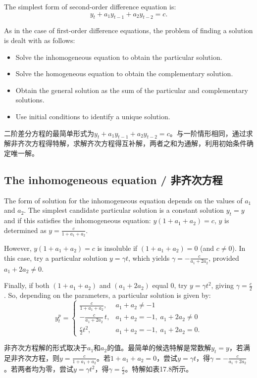 \begin{original}
The simplest form of second-order difference equation is:
\[
y_t + a_1 y_{t-1} + a_2 y_{t-2} = c.
\]

As in the case of first-order difference equations, the problem of finding a solution is dealt with as follows:
\begin{itemize}
\item Solve the inhomogeneous equation to obtain the particular solution.
\item Solve the homogeneous equation to obtain the complementary solution.
\item Obtain the general solution as the sum of the particular and complementary solutions.
\item Use initial conditions to identify a unique solution.
\end{itemize}
\end{original}
\begin{translation}
二阶差分方程的最简单形式为$y_t + a_1 y_{t-1} + a_2 y_{t-2} = c$。与一阶情形相同，通过求解非齐次方程得特解，求解齐次方程得互补解，两者之和为通解，利用初始条件确定唯一解。
\end{translation}

\subsection{The inhomogeneous equation / 非齐次方程}

\begin{original}
The form of solution for the inhomogeneous equation depends on the values of $a_1$ and $a_2$. The simplest candidate particular solution is a constant solution $y_t = y$ and if this satisfies the inhomogeneous equation: $y(1 + a_1 + a_2) = c$, $y$ is determined as $y = \frac{c}{1+a_1+a_2}$.

However, $y(1 + a_1 + a_2) = c$ is insoluble if $(1 + a_1 + a_2) = 0$ (and $c \neq 0$). In this case, try a particular solution $y = \gamma t$, which yields $\gamma = -\frac{c}{a_1+2a_2}$, provided $a_1 + 2a_2 \neq 0$.

Finally, if both $(1 + a_1 + a_2)$ and $(a_1 + 2a_2)$ equal $0$, try $y = \gamma t^2$, giving $\gamma = \frac{c}{2}$. So, depending on the parameters, a particular solution is given by:
\[
y_t^p = \begin{cases}
\frac{c}{1+a_1+a_2}, & a_1 + a_2 \neq -1\\[4pt]
-\frac{c}{a_1+2a_2}\,t, & a_1 + a_2 = -1,\; a_1 + 2a_2 \neq 0\\[4pt]
\frac{c}{2}t^2, & a_1 + a_2 = -1,\; a_1 + 2a_2 = 0.
\end{cases} \tag{17.8}
\]
\end{original}
\begin{translation}
非齐次方程解的形式取决于$a_1$和$a_2$的值。最简单的候选特解是常数解$y_t = y$，若满足非齐次方程，则$y = \frac{c}{1+a_1+a_2}$。若$1 + a_1 + a_2 = 0$，尝试$y = \gamma t$，得$\gamma = -\frac{c}{a_1+2a_2}$。若两者均为零，尝试$y = \gamma t^2$，得$\gamma = \frac{c}{2}$。特解如表17.8所示。
\end{translation}

